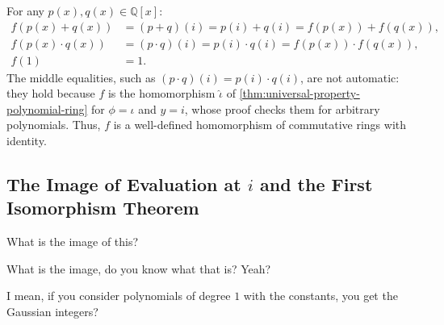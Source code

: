 \begin{content}
\begin{steps}
For any $p(x), q(x) \in \mathbb{Q}[x]$:
\begin{align*}
f(p(x) + q(x)) &= (p + q)(i) = p(i) + q(i) = f(p(x)) + f(q(x)), \\
f(p(x) \cdot q(x)) &= (p \cdot q)(i) = p(i) \cdot q(i) = f(p(x)) \cdot f(q(x)), \\
f(1) &= 1.
\end{align*}
The middle equalities, such as $(p \cdot q)(i) = p(i) \cdot q(i)$, are not automatic: they hold because $f$ is the homomorphism $\hat{\iota}$ of \cref{thm:universal-property-polynomial-ring} for $\phi = \iota$ and $y = i$, whose proof checks them for arbitrary polynomials. Thus, $f$ is a well-defined homomorphism of commutative rings with identity.
\end{steps}
\end{content}

\subsection{The Image of Evaluation at \texorpdfstring{$i$}{i} and the First Isomorphism Theorem}

\begin{speech}[01:22:36 - 01:22:55]
What is the image of this?  

What is the image, do you know what that is? Yeah?
\end{speech}

\begin{student}
I mean, if you consider polynomials of degree $1$ with the constants, you get the Gaussian integers?
\end{student}

